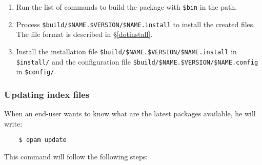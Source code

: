 \documentclass[a4paper,11pt]{article}
\begin{document}
\begin{enumerate}
\begin{enumerate}
\item Run the list of commands to build the package with \verb+$bin+
  in the path.

\item Process \verb+$build/$NAME.$VERSION/$NAME.install+ to install
  the created files. The file format is described in \S\ref{dotinstall}.

\item Install the installation file
  \verb+$build/$NAME.$VERSION/$NAME.install+ in \verb+$install/+ and
  the configuration file \verb+$build/$NAME.$VERSION/$NAME.config+ in
  \verb+$config/+.

\end{enumerate}
\end{enumerate}

\subsubsection{Updating index files}
\label{opam-update}

When an end-user wants to know what are the latest packages available,
he will write:

\begin{verbatim}
    $ opam update
\end{verbatim}

This command will follow the following steps:
\end{document}
